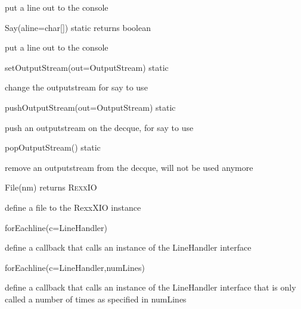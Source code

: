 \begin{description}
put a line out to the console
  \item{Say(aline=char[]) static returns boolean}

put a line out to the console
  \item{setOutputStream(out=OutputStream) static}

change the outputstream for say to use  
 
\item{pushOutputStream(out=OutputStream) static}


push an outputstream on the decque, for say to use
  \item{popOutputStream() static}

remove an outputstream from the decque, will not be used anymore
  \item{File(nm) returns R\textsc{exx}IO}

define a file to the RexxXIO instance
  \item{forEachline(c=LineHandler)}

define a callback that calls an instance of the LineHandler interface
  \item{forEachline(c=LineHandler,numLines)}

define a callback that calls an instance of the LineHandler interface that is only called a number of times as specified in numLines
\end{description}

